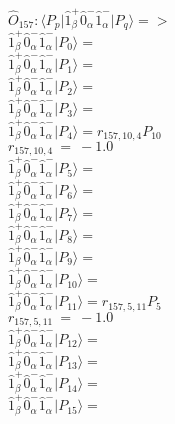 \documentclass[14pt]{article}
\begin{document}
    $\hat{O}_{157}:  \langle{P_p}\vert \hat{1}_{\beta}^{+}\hat{0}_{\alpha}^{-}\hat{1}_{\alpha}^{-} \vert{P_q}\rangle => $ \\ 
    $ \hat{1}_{\beta}^{+}\hat{0}_{\alpha}^{-}\hat{1}_{\alpha}^{-} \vert{P_{0}}\rangle =  $ \\ 
    $ \hat{1}_{\beta}^{+}\hat{0}_{\alpha}^{-}\hat{1}_{\alpha}^{-} \vert{P_{1}}\rangle =  $ \\ 
    $ \hat{1}_{\beta}^{+}\hat{0}_{\alpha}^{-}\hat{1}_{\alpha}^{-} \vert{P_{2}}\rangle =  $ \\ 
    $ \hat{1}_{\beta}^{+}\hat{0}_{\alpha}^{-}\hat{1}_{\alpha}^{-} \vert{P_{3}}\rangle =  $ \\ 
    $ \hat{1}_{\beta}^{+}\hat{0}_{\alpha}^{-}\hat{1}_{\alpha}^{-} \vert{P_{4}}\rangle = {r}_{157,10,4}P_{10} $ \\ 
    ${r}_{157,10,4}\ =\ -1.0 $ \\ 
    $ \hat{1}_{\beta}^{+}\hat{0}_{\alpha}^{-}\hat{1}_{\alpha}^{-} \vert{P_{5}}\rangle =  $ \\ 
    $ \hat{1}_{\beta}^{+}\hat{0}_{\alpha}^{-}\hat{1}_{\alpha}^{-} \vert{P_{6}}\rangle =  $ \\ 
    $ \hat{1}_{\beta}^{+}\hat{0}_{\alpha}^{-}\hat{1}_{\alpha}^{-} \vert{P_{7}}\rangle =  $ \\ 
    $ \hat{1}_{\beta}^{+}\hat{0}_{\alpha}^{-}\hat{1}_{\alpha}^{-} \vert{P_{8}}\rangle =  $ \\ 
    $ \hat{1}_{\beta}^{+}\hat{0}_{\alpha}^{-}\hat{1}_{\alpha}^{-} \vert{P_{9}}\rangle =  $ \\ 
    $ \hat{1}_{\beta}^{+}\hat{0}_{\alpha}^{-}\hat{1}_{\alpha}^{-} \vert{P_{10}}\rangle =  $ \\ 
    $ \hat{1}_{\beta}^{+}\hat{0}_{\alpha}^{-}\hat{1}_{\alpha}^{-} \vert{P_{11}}\rangle = {r}_{157,5,11}P_{5} $ \\ 
    ${r}_{157,5,11}\ =\ -1.0 $ \\ 
    $ \hat{1}_{\beta}^{+}\hat{0}_{\alpha}^{-}\hat{1}_{\alpha}^{-} \vert{P_{12}}\rangle =  $ \\ 
    $ \hat{1}_{\beta}^{+}\hat{0}_{\alpha}^{-}\hat{1}_{\alpha}^{-} \vert{P_{13}}\rangle =  $ \\ 
    $ \hat{1}_{\beta}^{+}\hat{0}_{\alpha}^{-}\hat{1}_{\alpha}^{-} \vert{P_{14}}\rangle =  $ \\ 
    $ \hat{1}_{\beta}^{+}\hat{0}_{\alpha}^{-}\hat{1}_{\alpha}^{-} \vert{P_{15}}\rangle =  $ \\ 
    
\end{document}
